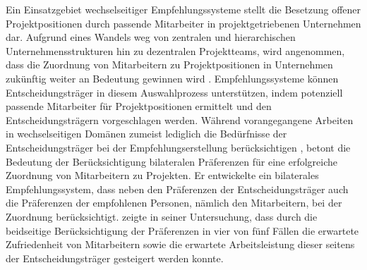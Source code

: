Ein Einsatzgebiet wechselseitiger Empfehlungssysteme stellt die Besetzung offener Projektpositionen durch passende Mitarbeiter in projektgetriebenen Unternehmen dar.
Aufgrund eines Wandels weg von zentralen und hierarchischen Unternehmensstrukturen hin zu dezentralen Projektteams, wird angenommen, dass die Zuordnung von Mitarbeitern zu Projektpositionen in Unternehmen zukünftig weiter an Bedeutung gewinnen wird \cite[S. 2]{link:booklet}. %
Empfehlungssysteme können Entscheidungsträger in diesem Auswahlprozess unterstützen, indem potenziell passende Mitarbeiter für Projektpositionen ermittelt und den Entscheidungsträgern vorgeschlagen werden.
Während vorangegangene Arbeiten in wechselseitigen Domänen zumeist lediglich die Bedürfnisse der Entscheidungsträger bei der Empfehlungserstellung berücksichtigen \cite[S. 2f.]{siting:2012}, betont \textcite[S. 2]{link:booklet} die Bedeutung der Berücksichtigung bilateralen Präferenzen für eine erfolgreiche Zuordnung von Mitarbeitern zu Projekten.
Er entwickelte ein bilaterales Empfehlungssystem, dass neben den Präferenzen der Entscheidungsträger auch die Präferenzen der empfohlenen Personen, nämlich den Mitarbeitern, bei der Zuordnung berücksichtigt.
\textcite[S. 3]{link:booklet} zeigte in seiner Untersuchung, dass durch die beidseitige Berücksichtigung der Präferenzen in vier von fünf Fällen die erwartete Zufriedenheit von Mitarbeitern sowie die erwartete Arbeitsleistung dieser seitens der Entscheidungsträger gesteigert werden konnte.

